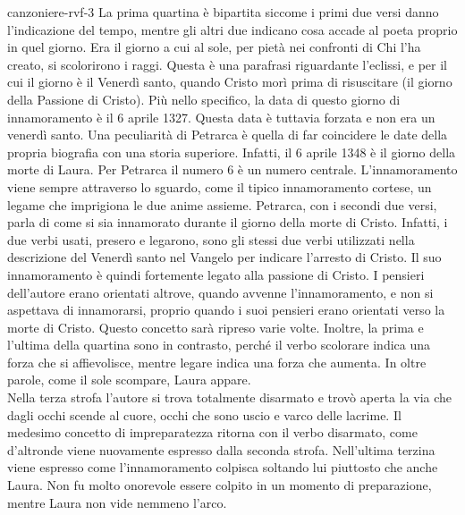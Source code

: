 \documentclass[preview]{standalone}
\begin{document}
\begin{snippet}{canzoniere-rvf-3}
    La prima quartina è bipartita siccome i primi due versi danno l'indicazione del tempo,
    mentre gli altri due indicano cosa accade al poeta proprio in quel giorno.
    Era il giorno a cui al sole, per pietà nei confronti di Chi l'ha creato, si scolorirono i raggi.
    Questa è una parafrasi riguardante l'eclissi, e per il cui il giorno è il Venerdì santo, quando
    Cristo morì prima di risuscitare (il giorno della Passione di Cristo).
    Più nello specifico, la data di questo giorno di innamoramento è il 6 aprile 1327.
    Questa data è tuttavia forzata e non era un venerdì santo.
    Una peculiarità di Petrarca è quella di far coincidere le date della propria biografia
    con una storia superiore. Infatti, il 6 aprile 1348 è il giorno della morte di Laura.
    Per Petrarca il numero 6 è un numero centrale.
    L'innamoramento viene sempre attraverso lo sguardo, come il tipico innamoramento cortese,
    un legame che imprigiona le due anime assieme.
    Petrarca, con i secondi due versi, parla di come si sia innamorato durante il giorno della morte di Cristo.
    Infatti, i due verbi usati, presero e legarono, sono gli stessi due verbi utilizzati nella descrizione
    del Venerdì santo nel Vangelo per indicare l'arresto di Cristo.
    Il suo innamoramento è quindi fortemente legato alla passione di Cristo.
    I pensieri dell'autore erano orientati altrove, quando avvenne l'innamoramento, e non si aspettava
    di innamorarsi, proprio quando i suoi pensieri erano orientati verso la morte di Cristo.
    Questo concetto sarà ripreso varie volte.
    Inoltre, la prima e l'ultima della quartina sono in contrasto, perché il verbo scolorare
    indica una forza che si affievolisce, mentre legare indica una forza che aumenta.
    In oltre parole, come il sole scompare, Laura appare. \\
    Nella terza strofa l'autore si trova totalmente disarmato e trovò aperta la via
    che dagli occhi scende al cuore, occhi che sono uscio e varco delle lacrime.
    Il medesimo concetto di impreparatezza ritorna con il verbo disarmato, come d'altronde viene
    nuovamente espresso dalla seconda strofa.
    Nell'ultima terzina viene espresso come
    l'innamoramento colpisca soltando lui piuttosto che anche Laura.
    Non fu molto onorevole essere colpito in un momento di preparazione, mentre
    Laura non vide nemmeno l'arco.

\end{snippet}
\end{document}
